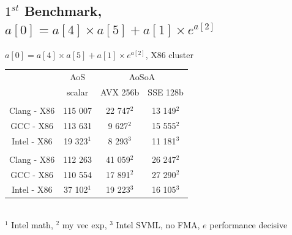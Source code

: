 \documentclass{beamer}
\begin{document}
\subsection*{$1^{st}$ Benchmark, $a[0] = a[4] \times a[5] + a[1] \times e^{a[2]}$}
\begin{frame}[fragile]
\begin{center}
$a[0] = a[4] \times a[5] + a[1] \times e^{a[2]}$, X86 cluster
\end{center}
\centering
\begin{tabular}{ c |  c  | c c }
     & AoS & \multicolumn{2}{c}{AoSoA}\\
                        & scalar & AVX 256b & SSE 128b\\
                        \hline
   \color{C0}{float}       &   & & \\
   Clang - X86 & 115 007  & 22 747$^2$ & \cellcolor{C2}13 149$^2$\\
   GCC - X86  & 113 631   & \cellcolor{C2}9 627$^2$ & 15 555$^2$ \\
   Intel - X86   & 19 323$^1$   & \cellcolor{C2}8 293$^3$ & 11 181$^3$\\
   \hline
   \color{C0}{double}       &   & & \\
   Clang - X86 & 112 263 & 41 059$^2$ & \cellcolor{C2}26 247$^2$\\
   GCC - X86  & 110 554   & \cellcolor{C2}17 891$^2$ & 27 290$^2$ \\
   Intel - X86   & 37 102$^1$ & 19 223$^3$ & \cellcolor{C2}16 105$^3$\\
   \hline
\end{tabular}\\
\vspace{0.5cm}
$^1$ Intel math, $^2$ my vec exp,  $^3$ Intel SVML, no FMA, $e$ performance decisive 
\end{frame}
\end{document}
